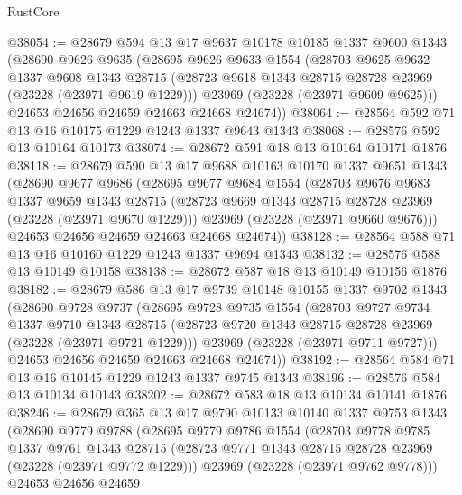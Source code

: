 \begin{lexlean}{RustCore}
\begin{coremodule}
@38054 := @28679
    @594
    @13
    @17
    @9637
    @10178
    @10185
    @1337
    @9600
    @1343
    (@28690
      @9626
      @9635
      (@28695
        @9626
        @9633
        @1554
        (@28703
          @9625
          @9632
          @1337
          @9608
          @1343
          @28715
          (@28723 @9618 @1343 @28715 @28728 @23969 (@23228 (@23971 @9619 @1229)))
          @23969
          (@23228 (@23971 @9609 @9625)))
        @24653
        @24656
        @24659
        @24663
        @24668
        @24674))
@38064 := @28564 @592 @71 @13 @16 @10175 @1229 @1243 @1337 @9643 @1343
@38068 := @28576 @592 @13 @10164 @10173
@38074 := @28672 @591 @18 @13 @10164 @10171 @1876
@38118 := @28679
    @590
    @13
    @17
    @9688
    @10163
    @10170
    @1337
    @9651
    @1343
    (@28690
      @9677
      @9686
      (@28695
        @9677
        @9684
        @1554
        (@28703
          @9676
          @9683
          @1337
          @9659
          @1343
          @28715
          (@28723 @9669 @1343 @28715 @28728 @23969 (@23228 (@23971 @9670 @1229)))
          @23969
          (@23228 (@23971 @9660 @9676)))
        @24653
        @24656
        @24659
        @24663
        @24668
        @24674))
@38128 := @28564 @588 @71 @13 @16 @10160 @1229 @1243 @1337 @9694 @1343
@38132 := @28576 @588 @13 @10149 @10158
@38138 := @28672 @587 @18 @13 @10149 @10156 @1876
@38182 := @28679
    @586
    @13
    @17
    @9739
    @10148
    @10155
    @1337
    @9702
    @1343
    (@28690
      @9728
      @9737
      (@28695
        @9728
        @9735
        @1554
        (@28703
          @9727
          @9734
          @1337
          @9710
          @1343
          @28715
          (@28723 @9720 @1343 @28715 @28728 @23969 (@23228 (@23971 @9721 @1229)))
          @23969
          (@23228 (@23971 @9711 @9727)))
        @24653
        @24656
        @24659
        @24663
        @24668
        @24674))
@38192 := @28564 @584 @71 @13 @16 @10145 @1229 @1243 @1337 @9745 @1343
@38196 := @28576 @584 @13 @10134 @10143
@38202 := @28672 @583 @18 @13 @10134 @10141 @1876
@38246 := @28679
    @365
    @13
    @17
    @9790
    @10133
    @10140
    @1337
    @9753
    @1343
    (@28690
      @9779
      @9788
      (@28695
        @9779
        @9786
        @1554
        (@28703
          @9778
          @9785
          @1337
          @9761
          @1343
          @28715
          (@28723 @9771 @1343 @28715 @28728 @23969 (@23228 (@23971 @9772 @1229)))
          @23969
          (@23228 (@23971 @9762 @9778)))
        @24653
        @24656
        @24659

\end{coremodule}
\end{lexlean}

